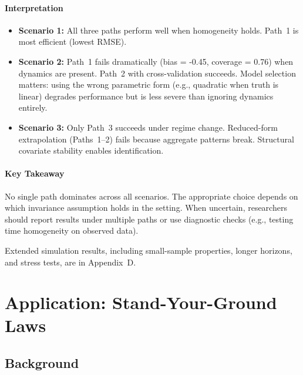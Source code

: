\documentclass{article}
\begin{document}
\paragraph{Interpretation}


\begin{itemize}
\item \textbf{Scenario 1:} All three paths perform well when homogeneity holds. Path~1 is most efficient (lowest RMSE).
\item \textbf{Scenario 2:} Path~1 fails dramatically (bias = -0.45, coverage = 0.76) when dynamics are present. Path~2 with cross-validation succeeds. Model selection matters: using the wrong parametric form (e.g., quadratic when truth is linear) degrades performance but is less severe than ignoring dynamics entirely.
\item \textbf{Scenario 3:} Only Path~3 succeeds under regime change. Reduced-form extrapolation (Paths~1--2) fails because aggregate patterns break. Structural covariate stability enables identification.
\end{itemize}

\paragraph{Key Takeaway}

No single path dominates across all scenarios. The appropriate choice depends on which invariance assumption holds in the setting. When uncertain, researchers should report results under multiple paths or use diagnostic checks (e.g., testing time homogeneity on observed data).

Extended simulation results, including small-sample properties, longer horizons, and stress tests, are in Appendix~D.


\section{Application: Stand-Your-Ground Laws}
\label{sec:application}


\subsection{Background}

\end{document}
